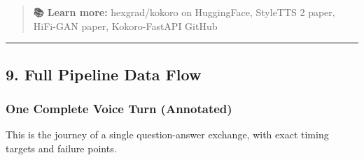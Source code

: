 \documentclass[
  11pt,
]{article}
\begin{document}
\begin{quote}
\textbf{📚 Learn more:} hexgrad/kokoro on HuggingFace, StyleTTS 2 paper,
HiFi-GAN paper, Kokoro-FastAPI GitHub
\end{quote}

\begin{center}\rule{0.5\linewidth}{0.5pt}\end{center}

\hypertarget{full-pipeline-data-flow}{%
\subsection{9. Full Pipeline Data Flow}\label{full-pipeline-data-flow}}

\hypertarget{one-complete-voice-turn-annotated}{%
\subsubsection{One Complete Voice Turn
(Annotated)}\label{one-complete-voice-turn-annotated}}

This is the journey of a single question-answer exchange, with exact
timing targets and failure points.
\end{document}
